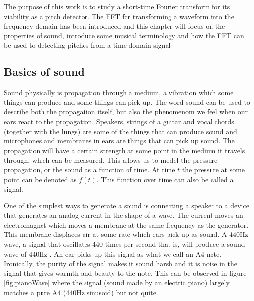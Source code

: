 The purpose of this work is to study a short-time Fourier transform for its viability as a pitch detector. The FFT for transforming a waveform into the frequency-domain has been introduced and this chapter will focus on the properties of sound, introduce some musical terminology and how the FFT can be used to detecting pitches from a time-domain signal

\subsection{Basics of sound}
Sound physically is propagation through a medium, a vibration which some things can produce and some things can pick up. The word sound can be used to describe both the propagation itself, but also the phenomenom we feel when our ears react to the propagation. Speakers, strings of a guitar and vocal chords (together with the lungs) are some of the things that can produce sound and microphones and membranes in ears are things that can pick up sound. The propagation will have a certain strength at some point in the medium it travels through, which can be measured. This allows us to model the pressure propagation, or the sound as a function of time. At time $t$ the pressure at some point can be denoted as $f(t)$. This function over time can also be called a signal.


One of the simplest ways to generate a sound is connecting a speaker to a device that generates an analog current in the shape of a wave. The current moves an electromagnet which moves a membrane at the same frequency as the generator. This membrane displaces air at some rate which ears pick up as sound. A 440Hz wave, a signal that oscillates 440 times per second that is, will produce a sound wave of 440Hz . An ear picks up this signal as what we call an A4 note. Ironically, the purity of the signal makes it sound harsh and it is noise in the signal that gives warmth and beauty to the note. This can be observed in figure \ref{fig:pianoWave} where the signal (sound made by an electric piano) largely matches a pure A4 (440Hz sinusoid) but not quite.


